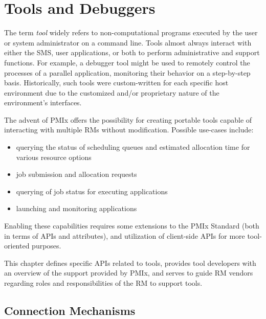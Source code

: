 \chapter{Tools and Debuggers}
\label{chap:api_tools}

The term \textit{tool} widely refers to non-computational programs executed by the user or system administrator on a command line. Tools almost always interact with either the \ac{SMS}, user applications, or both to perform administrative and support functions. For example, a debugger tool might be used to remotely control the processes of a parallel application, monitoring their behavior on a step-by-step basis. Historically, such tools were custom-written for each specific host environment due to the customized and/or proprietary nature of the environment's interfaces.

The advent of \ac{PMIx} offers the possibility for creating portable tools capable of interacting with multiple \acp{RM} without modification. Possible use-cases include:

\begin{itemize}
\item querying the status of scheduling queues and estimated allocation time for various resource options
\item job submission and allocation requests
\item querying of job status for executing applications
\item launching and monitoring applications
\end{itemize}

Enabling these capabilities requires some extensions to the \ac{PMIx} Standard (both in terms of \acp{API} and attributes), and utilization of client-side \acp{API} for more tool-oriented purposes.

This chapter defines specific \acp{API} related to tools, provides tool developers with an overview of the support provided by \ac{PMIx}, and serves to guide \ac{RM} vendors regarding roles and responsibilities of the \ac{RM} to support tools.

\section{Connection Mechanisms}
\label{chap:api_tools:cnct}

